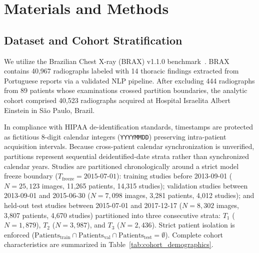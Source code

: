 \documentclass[preprint,12pt]{elsarticle}
\begin{document}
\section{Materials and Methods}

\subsection{Dataset and Cohort Stratification}
We utilize the Brazilian Chest X-ray (BRAX) v1.1.0 benchmark~\cite{reis2022brax}. BRAX contains 40,967 radiographs labeled with 14 thoracic findings extracted from Portuguese reports via a validated NLP pipeline. After excluding 444 radiographs from 89 patients whose examinations crossed partition boundaries, the analytic cohort comprised 40,523 radiographs acquired at Hospital Israelita Albert Einstein in S\~ao Paulo, Brazil.

In compliance with HIPAA de-identification standards, timestamps are protected as fictitious 8-digit calendar integers (\texttt{YYYYMMDD}) preserving intra-patient acquisition intervals. Because cross-patient calendar synchronization is unverified, partitions represent sequential deidentified-date strata rather than synchronized calendar years. Studies are partitioned chronologically around a strict model freeze boundary ($T_{\text{freeze}} = \text{2015-07-01}$): training studies before 2013-09-01 ($N = 25,123$ images, 11,265 patients, 14,315 studies); validation studies between 2013-09-01 and 2015-06-30 ($N = 7,098$ images, 3,281 patients, 4,012 studies); and held-out test studies between 2015-07-01 and 2017-12-17 ($N = 8,302$ images, 3,807 patients, 4,670 studies) partitioned into three consecutive strata: $T_1$ ($N=1,879$), $T_2$ ($N=3,987$), and $T_3$ ($N=2,436$). Strict patient isolation is enforced ($\text{Patients}_{\text{train}} \cap \text{Patients}_{\text{val}} \cap \text{Patients}_{\text{test}} = \emptyset$). Complete cohort characteristics are summarized in Table~\ref{tab:cohort_demographics}.

\begin{table}[!t]
\caption{Cohort Demographics, Radiographic Projections, and Target Condition Prevalence across Stratified Cohorts}
\label{tab:cohort_demographics}
\centering
\resizebox{\textwidth}{!}{%

}
\end{table}
\end{document}

